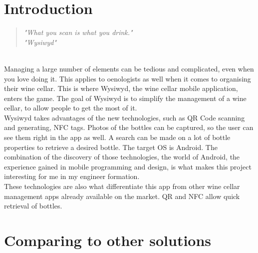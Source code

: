  

\thispagestyle{empty}

\titleTH %

\newpage

\tableofcontents

\newpage


\section{Introduction}

\begin{quotation}
\center \emph{"What you scan is what you drink."\\ "Wysiwyd"}
\end{quotation}

~\\

Managing a large number of elements can be tedious and complicated, even when you love doing it. This applies to oenologists as well when it comes to organising their wine cellar. This is where Wysiwyd, the wine cellar mobile application, enters the game. The goal of Wysiwyd is to simplify the management of a wine cellar, to allow people to get the most of it.\\

Wysiwyd takes advantages of the new technologies, such as QR Code scanning and generating, NFC tags. Photos of the bottles can be captured, so the user can see them right in the app as well. A search can be made on a lot of bottle properties to retrieve a desired bottle. The target OS is Android. The combination of the discovery of those technologies, the world of Android, the experience gained in mobile programming and design, is what makes this project interesting for me in my engineer formation.\\

These technologies are also what differentiate this app from other wine cellar management apps already available on the market. QR and NFC allow quick retrieval of bottles.

\section{Comparing to other solutions}

